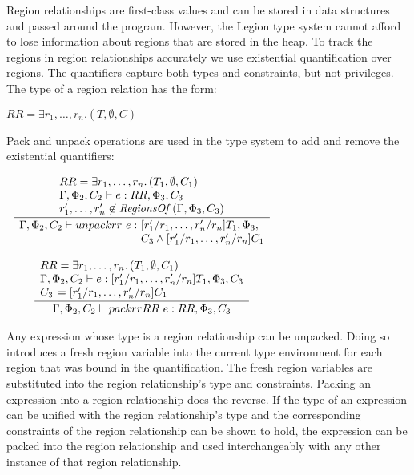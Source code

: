Region relationships are first-class values and can be stored in data structures
and passed around the program.  However, the Legion type
system cannot afford to lose information about regions that are stored
in the heap.  To track the regions
in region relationships accurately we use existential quantification
over regions.  The quantifiers capture both types and constraints, but 
not privileges.  The type of a region relation has the form:
\begin{center}
$RR = \exists r_1, \ldots, r_n.\left(T, \emptyset, C\right)$
\end{center}
Pack and unpack operations are used in the type system
to add and remove the existential quantifiers:
\begin{center}
{\small
\begin{math}
\begin{array}{c}
\infrule{
\begin{array}{l}
RR = \exists r_1, \ldots, r_n.\left(T_1, \emptyset, C_1\right) \\
\Gamma, \Phi_2, C_2 \vdash e : RR, \Phi_3, C_3  \\
r'_1, \ldots, r'_n \not\in \mathit{RegionsOf}\left(\Gamma, \Phi_3, C_3\right)
\end{array}
}{
\begin{array}{l@{}l}
\Gamma, \Phi_2, C_2 \vdash unpackrr{~}e :~  & [r'_1/r_1,\ldots,r'_n/r_n]T_1, \Phi_3, \\
& C_3 \wedge [r'_1/r_1,\ldots,r'_n/r_n]C_1
\end{array}
}
\\
\\
\infrule{
\begin{array}{l}
RR = \exists r_1, \ldots, r_n.\left(T_1, \emptyset, C_1\right) \\
\Gamma, \Phi_2, C_2 \vdash e : [r'_1/r_1,\ldots,r'_n/r_n]T_1, \Phi_3, C_3 \\
C_3 \models [r'_1/r_1,\ldots,r'_n/r_n]C_1
\end{array}
}{
\begin{array}{l}
\Gamma, \Phi_2, C_2 \vdash packrr{ }RR\mbox{ }e : RR, \Phi_3, C_3 \\
\end{array}
}
\end{array}
\end{math}
}
\end{center}
Any expression whose type is a region relationship can be unpacked.
Doing so introduces a fresh region variable into the current type
environment for each region that was bound in the quantification.  The
fresh region variables are substituted into the region relationship's
type and constraints.  Packing an expression into a region
relationship does the reverse.  If the type of an expression can be
unified with the region relationship's type and the corresponding
constraints of the region relationship can be shown to hold, the
expression can be packed into the region relationship and used
interchangeably with any other instance of that region relationship.

